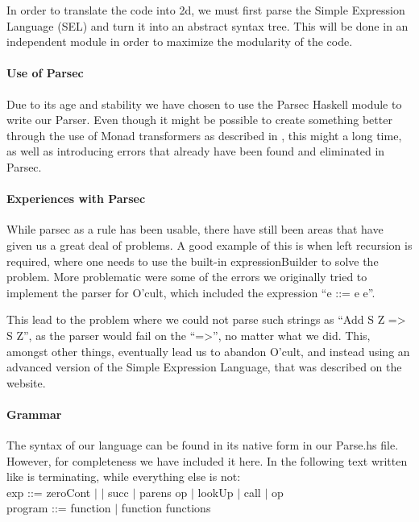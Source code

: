 In order to translate the code into 2d, we must first parse the Simple
Expression Language (SEL) and turn it into an abstract syntax
tree. This will be done in an independent module in order to maximize
the modularity of the code.

\paragraph{Use of Parsec}
Due to its age and stability we have chosen to use the Parsec Haskell
module to write our Parser. Even though it might be possible to create
something better through the use of Monad transformers as described in
\cite{partial+parsing}, this might a long time, as well as introducing
errors that already have been found and eliminated in Parsec.

\paragraph{Experiences with Parsec}
While parsec as a rule has been usable, there have still been areas that have given us a great deal of problems. A
good example of this is when left recursion is required, where one
needs to use the built-in expressionBuilder to solve the problem. More
problematic were some of the errors we originally tried to implement
the parser for O'cult, which included the expression ``e ::= e e''.

This lead to the problem where we could not parse such strings as
``Add S Z => S Z'', as the parser would fail on the ``=>'', no matter
what we did. This, amongst other things, eventually lead us to abandon
O'cult, and instead using an advanced version of the Simple Expression
Language, that was described on the website.

\paragraph{Grammar}
The syntax of our language can be found in its native form in our
Parse.hs file. However, for completeness we have included it here. In
the following text written like  is terminating, while
everything else is not:\\

exp ::= zeroCont $\mid$  $\mid$ succ $\mid$ parens op $\mid$ lookUp $\mid$ call $\mid$ op\\

program ::= function $\mid$ function functions\\

